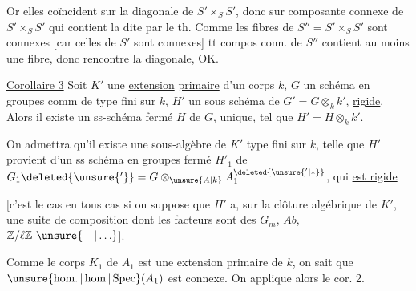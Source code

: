 Or elles coïncident sur la diagonale de $S'\times_S S'$, donc sur  composante connexe de $S'\times_S S'$ qui contient la dite par le th. Comme les fibres de $S''=S'\times_S S'$ sont connexes [car celles de $S'$ sont  connexes] tt compos conn. de $S''$ contient au moins une fibre, donc
rencontre la diagonale, OK.

\uline{Corollaire 3} Soit $K'$ une \uline{extension} \uline{primaire} d'un corps $k$, $G$ un schéma en groupes comm de type fini sur $k$, $H'$ un sous schéma  de $G'=G\otimes_k k'$, \uline{rigide}. Alors il existe un ss-schéma  fermé $H$ de $G$, unique,  tel que $H'=H\otimes_k k'$.

On admettra qu'il existe une sous-algèbre  de $K'$  type fini sur $k$, telle que $H'$ provient d'un ss schéma en groupes fermé $H'_1$ de $G_1\deleted{\unsure{'}}=G\otimes_{\unsure{A|k}}A_1^{\deleted{\unsure{'|*}}}$,  qui \uline{est rigide}

[c'est le cas en tous cas si on  suppose que $H'$ a, sur la clôture algébrique de $K'$, une suite de composition dont les facteurs sont des $G_m$, $Ab$, $\mathbb Z/\ell\mathbb Z\ \unsure{\text{---}|\ldots}$].

 Comme le corps $K_1$ de $A_1$ est une extension primaire de $k$, on sait que $\unsure{\operatorname{hom.}|\operatorname{hom}|\operatorname{Spec}}(A_1)$ est  connexe. On applique alors le cor. 2.
